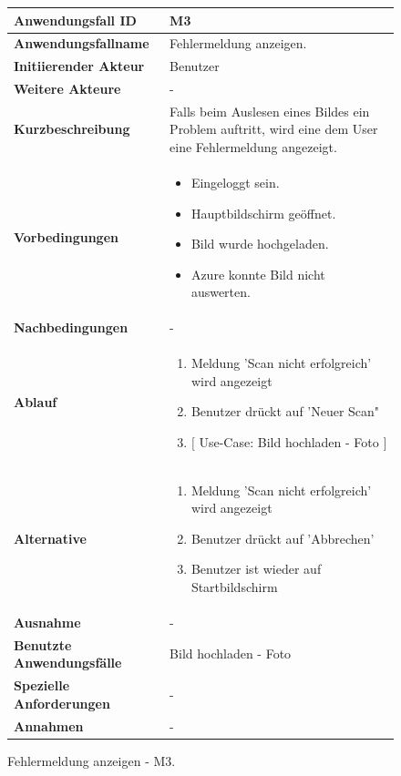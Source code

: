 \newpage

\begin{figure}[h]
	\centering
	\begin{tabularx}{\textwidth}{ X | X }
		\textbf{Anwendungsfall ID} & M3 \\ \hline
		\textbf{Anwendungsfallname} & Fehlermeldung anzeigen. \\ \hline
		\textbf{Initiierender Akteur} & Benutzer \\ \hline
		\textbf{Weitere Akteure} & - \\ \hline
		\textbf{Kurzbeschreibung} & Falls beim Auslesen eines Bildes ein Problem auftritt, wird eine dem User eine Fehlermeldung angezeigt.   \\ \hline
		\textbf{Vorbedingungen} & 
		\begin {itemize}
			\item Eingeloggt sein. 
			\item Hauptbildschirm geöffnet.
			\item Bild wurde hochgeladen.
			\item Azure konnte Bild nicht auswerten.
		\end{itemize}\\ \hline
		\textbf{Nachbedingungen} & - \\ \hline
		\textbf{Ablauf} &
		\begin{enumerate}
			\item Meldung 'Scan nicht erfolgreich' wird angezeigt
			\item Benutzer drückt auf 'Neuer Scan"
			\item $\lbrack$ Use-Case: Bild hochladen - Foto $\rbrack$
		\end{enumerate} \\ \hline
		\textbf{Alternative} & 
		\begin{enumerate}
			\item Meldung 'Scan nicht erfolgreich' wird angezeigt
			\item Benutzer drückt auf 'Abbrechen'
			\item Benutzer ist wieder auf Startbildschirm
		\end{enumerate} \\ \hline
		\textbf{Ausnahme} & -   \\ \hline
		\textbf{Benutzte Anwendungsfälle} & Bild hochladen - Foto \\ \hline
		\textbf{Spezielle Anforderungen} & - \\ \hline
		\textbf{Annahmen} & -
	\end{tabularx}
	\caption{Fehlermeldung anzeigen - M3.}
	\label{fig:anwendungsfall-server-tabelle-xx-1}
\end{figure}

